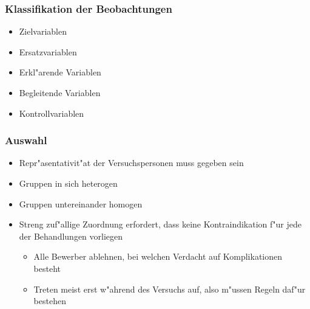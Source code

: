 \documentclass{beamer}
\begin{document}
\begin{frame}
  \frametitle{Klassifikation der Beobachtungen}
  \begin{itemize}[<+->]
    \item Zielvariablen
    \item Ersatzvariablen
    \item Erkl"arende Variablen
    \item Begleitende Variablen
    \item Kontrollvariablen
  \end{itemize}
\end{frame}

\begin{frame}
  \frametitle{Auswahl}
  \begin{itemize}[<+->]
    \item Repr"asentativit"at der Versuchspersonen muss gegeben sein
    \item Gruppen in sich heterogen
    \item Gruppen untereinander homogen
    \item Streng zuf"allige Zuordnung erfordert, dass keine Kontraindikation f"ur jede der Behandlungen vorliegen
      \begin{itemize}[<+->]
        \item Alle Bewerber ablehnen, bei welchen Verdacht auf Komplikationen besteht
        \item Treten meist erst w"ahrend des Versuchs auf, also m"ussen Regeln daf"ur bestehen
      \end{itemize}
  \end{itemize}
\end{frame}
\end{document}
